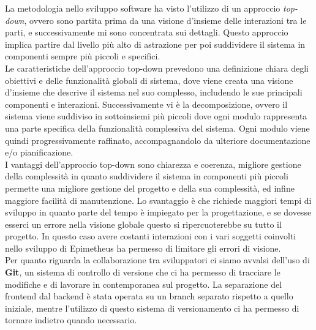 La metodologia nello sviluppo software ha visto l'utilizzo di un approccio \textit{top-down}, ovvero sono partita prima da una visione d'insieme delle interazioni tra le parti, e successivamente mi sono concentrata sui dettagli. Questo approccio implica partire dal livello più alto di astrazione per poi suddividere il sistema in componenti sempre più piccoli e specifici. \\
Le caratteristiche dell'approccio top-down prevedono una definizione chiara degli obiettivi e delle funzionalità globali di sistema, dove viene creata una visione d'insieme che descrive il sistema nel suo complesso, includendo le sue principali componenti e interazioni. Successivamente vi è la decomposizione, ovvero il sistema viene suddiviso in sottoinsiemi più piccoli dove ogni modulo rappresenta una parte specifica della funzionalità complessiva del sistema. Ogni modulo viene quindi progressivamente raffinato, accompagnandolo da ulteriore documentazione e/o pianificazione. \\
I vantaggi dell'approccio top-down sono chiarezza e coerenza, migliore gestione della complessità in quanto suddividere il sistema in componenti più piccoli permette una migliore gestione del progetto e della sua complessità, ed infine maggiore facilità di manutenzione. Lo svantaggio è che richiede maggiori tempi di sviluppo in quanto parte del tempo è impiegato per la progettazione, e se dovesse esserci un errore nella visione globale questo si ripercuoterebbe su tutto il progetto. In questo caso avere costanti interazioni con i vari soggetti coinvolti nello sviluppo di Epimetheus ha permesso di limitare gli errori di visione.\\

Per quanto riguarda la collaborazione tra sviluppatori ci siamo avvalsi dell'uso di \textbf{Git}, un sistema di controllo di versione che ci ha permesso di tracciare le modifiche e di lavorare in contemporanea sul progetto. La separazione del frontend dal backend è stata operata su un branch separato rispetto a quello iniziale, mentre l'utilizzo di questo sistema di versionamento ci ha permesso di tornare indietro quando necessario.

